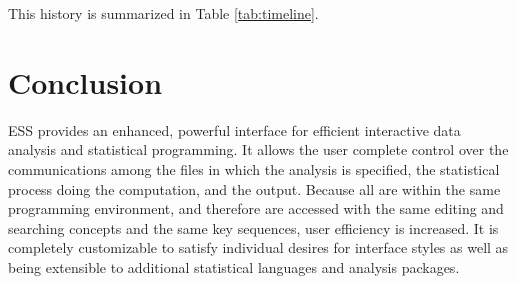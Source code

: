 \documentclass{article}
\newcommand*{\SAS}{\textsc{SAS}}
\newenvironment{Comment}{\begin{quote}\small\itshape }{\end{quote}}
\begin{document}

This history is summarized in Table \ref{tab:timeline}.


\section{Conclusion}
\label{sec:concl}



ESS provides an enhanced, powerful interface for efficient interactive
data analysis and statistical programming.  It allows the user
complete control over the communications among the files in which the
analysis is specified, the statistical process doing the computation,
and the output.  Because all are within the same programming
environment, and therefore are accessed with the same editing and
searching concepts and the same key sequences, user efficiency is
increased.  It is completely customizable to satisfy individual
desires for interface styles as well as being extensible to additional
statistical languages and analysis packages.





\end{document}
